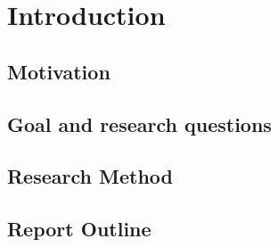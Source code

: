 \chapter{Introduction}

\begin{comment}    
1.1 Motivation

1.2 Goal and research questions
The overall goal of this research is ...
RQ1, RQ2, ...
- Pipeline
- Eksperimenter

1.3 Thesis outline
\end{comment}


\section{Motivation}



\section{Goal and research questions}


\begin{description}[leftmargin=!,labelwidth=\widthof{RQ 1:}]
\item[\textbf{RQ 1:}]

\item[\textbf{RQ 2:}]

\item[\textbf{RQ 3:}]

\item[\textbf{RQ 4:}]

\end{description}


\section{Research Method}


\section{Report Outline}

